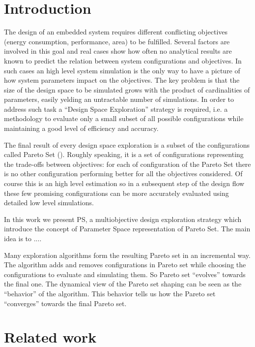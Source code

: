 
\section{Introduction}

The design of an embedded system requires different conflicting
objectives (energy consumption, performance, area) to be fulfilled.
Several factors are involved in this goal and real cases show how
often no analytical results are known to predict the relation between
system configurations and objectives. In such cases an high level
system simulation is the only way to have a picture of how system
parameters impact on the objectives.  The key problem is that the size
of the design space to be simulated grows with the product of
cardinalities of parameters, easily yelding an untractable number
of simulations. In order to address such task a ``Design Space
Exploration'' strategy is required, i.e. a methodology to evaluate
only a small subset of all possible configurations while maintaining a
good level of efficiency and accuracy.

The final result of every design space exploration is a subset of the
configurations called Pareto Set (\cite{pareto}). Roughly speaking, it
is a set of configurations representing the trade-offs between
objectives: for each of configuration of the Pareto Set there is no
other configuration performing better for all the objectives
considered. Of course this is an high level estimation so in a
subsequent step of the design flow these few promising configurations
can be more accurately evaluated using detailed low level simulations.

In this work we present PS, a multiobjective design exploration
strategy which introduce the concept of Parameter Space representation
of Pareto Set. The main idea is to ....

Many exploration algorithms form the resulting Pareto set in an incremental
way. The algorithm adds and removes configurations in Pareto set while
choosing the configurations to evaluate and simulating them. So Pareto
set ``evolves'' towards the final one. The dynamical view of the
Pareto set shaping can be seen as the ``behavior'' of the algorithm.
This behavior tells us how the Pareto set ``converges'' towards
the final Pareto set. 

\section{\label{sec:Related-work}Related work}

